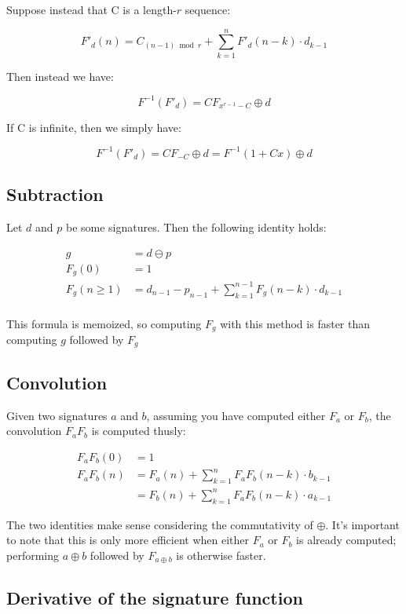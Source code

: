 \documentclass{article}
\begin{document}
\noindent Suppose instead that C is a length-$r$ sequence:

$$F'_d (n) = C_{(n-1) \bmod r} + \sum_{k=1}^{n} F'_d (n-k) \cdot d_{k-1}$$

\noindent Then instead we have:

$$F^{-1}(F'_d) = CF_{x^{r-1} - C} \oplus d$$

\noindent If C is infinite, then we simply have:

$$F^{-1}(F'_d) = CF_{-C} \oplus d = F^{-1} (1 + Cx) \oplus d$$

\subsection{Subtraction}

Let $d$ and $p$ be some signatures. Then the following identity holds:

\begin{align*}
g &= d \ominus p\\
F_g(0) &= 1\\
F_g(n \geq 1) &= d_{n-1} - p_{n-1} + \sum_{k=1}^{n-1} F_g(n-k) \cdot d_{k-1}\\
\end{align*}

\noindent This formula is memoized, so computing $F_g$ with this method is faster than computing $g$ followed by $F_g$\\

\subsection{Convolution}

Given two signatures $a$ and $b$, assuming you have computed either $F_a$ or $F_b$, the convolution $F_a F_b$ is computed thusly:

\begin{align*}
F_a F_b (0) &= 1\\
F_a F_b (n) &= F_a(n) + \sum_{k=1}^{n} F_a F_b (n-k) \cdot b_{k-1}\\
&= F_b(n) + \sum_{k=1}^{n} F_a F_b (n-k) \cdot a_{k-1}
\end{align*}

\noindent The two identities make sense considering the commutativity of $\oplus$. It's important to note that this is only more efficient when either $F_a$ or $F_b$ is already computed; performing $a \oplus b$ followed by $F_{a \oplus b}$ is otherwise faster.

\subsection{Derivative of the signature function}
\end{document}
